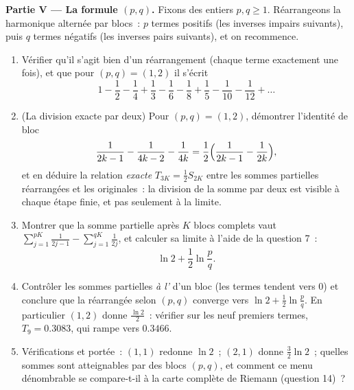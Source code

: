 \begin{problem}[{Devoir maison --- $H_n = \ln n + \gamma +
\frac{1}{2n} + O(n^{-2})$, et le réarrangement de $1 - \frac12 +
\frac13 - \dots$ en $\frac{\ln 2}{2}$}]
\medskip
\noindent\textbf{Partie V --- La formule $(p, q)$.} Fixons des
entiers $p, q \geq 1$. Réarrangeons la  harmonique alternée par
blocs~: $p$ termes positifs (les inverses impairs suivants), puis $q$
termes négatifs (les inverses pairs suivants), et on recommence.
\begin{enumerate}[resume]
  \item Vérifier qu'il s'agit bien d'un réarrangement (chaque terme
        exactement une fois), et que pour $(p, q) = (1, 2)$ il
        s'écrit
        \[
        1 - \frac12 - \frac14 + \frac13 - \frac16 - \frac18 +
        \frac15 - \frac1{10} - \frac1{12} + \dots
        \]
  \item (La division exacte par deux) Pour $(p, q) = (1, 2)$,
        démontrer l'identité de bloc
        \[
        \frac{1}{2k-1} - \frac{1}{4k-2} - \frac{1}{4k}
        = \frac12\Bigl(\frac{1}{2k-1} - \frac{1}{2k}\Bigr),
        \]
        et en déduire la relation \emph{exacte} $T_{3K} = \frac12
        S_{2K}$ entre les sommes partielles réarrangées et les
        originales~: la division de la somme par deux est visible à
        chaque étape finie, et pas seulement à la limite.
  \item Montrer que la somme partielle après $K$ blocs complets vaut
        $\sum_{j=1}^{pK} \frac{1}{2j-1} - \sum_{j=1}^{qK}
        \frac{1}{2j}$, et calculer sa limite à l'aide de la question
        7~:
        \[
        \ln 2 + \frac12 \ln\frac pq .
        \]
  \item Contrôler les sommes partielles \emph{à l'} d'un
        bloc (les termes tendent vers $0$) et conclure que la 
        réarrangée selon $(p, q)$ converge vers $\ln 2 + \frac12\ln
        \frac pq$. En particulier $(1, 2)$ donne $\frac{\ln
        2}{2}$~: vérifier sur les neuf premiers termes, $T_9 =
        0.3083$, qui rampe vers $0.3466$.
  \item Vérifications et portée~: $(1,1)$ redonne $\ln 2$~;
        $(2,1)$ donne $\frac32\ln 2$~; quelles sommes sont
        atteignables par des blocs $(p, q)$, et comment ce menu
        dénombrable se compare-t-il à la carte complète de Riemann
        (question 14)~?
\end{enumerate}


\end{problem}
